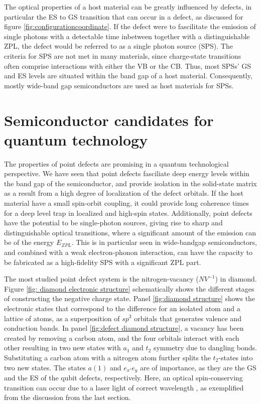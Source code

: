 The optical properties of a host material can be greatly influenced by defects, in particular the ES to GS transition that can occur in a defect, as discussed for figure \ref{fig:configurationcoordinate}. If the defect were to fascilitate the emission of single photons with a detectable time inbetween together with a distinguishable ZPL, the defect would be referred to as a single photon source (SPS). The criteria for SPS are not met in many materials, since charge-state transitions often comprise interactions with either the VB or the CB. Thus, most SPSs' GS and ES levels are situated within the band gap of a host material. Consequently, mostly wide-band gap semiconductors are used as host materials for SPSs.

\section{Semiconductor candidates for quantum technology}

The properties of point defects are promising in a quantum technological perspective. We have seen that point defects fasciliate deep energy levels within the band gap of the semiconductor, and provide isolation in the solid-state matrix as a result from a high degree of localization of the defect orbitals. If the host material have a small spin-orbit coupling, it could provide long coherence times for a deep level trap in localized and high-spin states. Additionally, point defects have the potential to be single-photon sources, giving rise to sharp and distinguishable optical transitions, where a significant amount of the emission can be of the energy $E_{ZPL}$. This is in particular seen in wide-bandgap semiconductors, and combined with a weak electron-phonon interaction, can have the capacity to be fabricated as a high-fidelity SPS with a significant ZPL part.

The most studied point defect system is the nitrogen-vacancy ($NV^{-1}$) in diamond. Figure \ref{fig: diamond electronic structure} schematically shows the different stages of constructing the negative charge state. Panel \ref{fig:diamond structure} shows the electronic states that correspond to the difference for an isolated atom and a lattice of atoms, as a superposition of $sp^3$ orbitals that generates valence and conduction bands. In panel \ref{fig:defect diamond structure}, a vacancy has been created by removing a carbon atom, and the four orbitals interact with each other resulting in two new states with $a_1$ and $t_2$ symmetry due to dangling bonds. Substituting a carbon atom with a nitrogen atom further splits the $t_2$-states into two new states. The states $a(1)$ and $e_{x'}e_y$ are of importance, as they are the GS and the ES of the qubit defects, respectively. Here, an optical spin-conserving transition can occur due to a laser light of correct wavelength \cite{Gordon2013}, as exemplified from the discussion from the last section.

